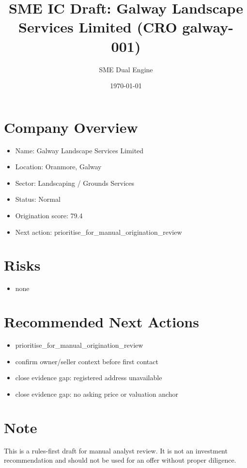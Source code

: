 \documentclass[11pt,a4paper]{article}
\title{SME IC Draft: Galway Landscape Services Limited (CRO galway-001)}
\author{SME Dual Engine}
\date{\today}
\begin{document}
\maketitle
\section*{Company Overview}
\begin{itemize}[leftmargin=1.4em]
\item Name: Galway Landscape Services Limited
\item Location: Oranmore, Galway
\item Sector: Landscaping / Grounds Services
\item Status: Normal
\item Origination score: 79.4
\item Next action: prioritise\_for\_manual\_origination\_review
\end{itemize}
\section*{Risks}
\begin{itemize}[leftmargin=1.4em]
\item none
\end{itemize}
\section*{Recommended Next Actions}
\begin{itemize}[leftmargin=1.4em]
\item prioritise\_for\_manual\_origination\_review
\item confirm owner/seller context before first contact
\item close evidence gap: registered address unavailable
\item close evidence gap: no asking price or valuation anchor
\end{itemize}
\section*{Note}
This is a rules-first draft for manual analyst review. It is not an investment
recommendation and should not be used for an offer without proper diligence.
\end{document}
